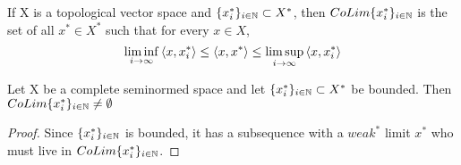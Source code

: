 \begin{df}
    If X is a topological vector space and $\{x_i^*\}_{i \in \mathbb{N}} \subset X^*$, then $CoLim\{x_i^*\}_{i \in \mathbb{N}}$ is the set of all $x^* \in X^*$ such that for every $x \in X$,
    \begin{equation}
        \liminf\limits_{i \to \infty} \left\langle x,x_i^* \right\rangle \leq  \left\langle x,x^* \right\rangle \leq \limsup\limits_{i \to \infty} \left\langle x,x_i^* \right\rangle
    \end{equation}
\end{df} 
\begin{rmk}
    \label{rmk:colimnonempty}
    Let X be a complete seminormed space and let $\{x_i^*\}_{i \in \mathbb{N}} \subset X^*$ be bounded. Then $CoLim\{x_i^*\}_{i \in \mathbb{N}} \neq \emptyset$
    \begin{proof}
        Since $\{x_i^*\}_{i \in \mathbb{N}}$ is bounded, it has a subsequence with a $weak^*$ limit $x^*$ who must live in $CoLim\{x_i^*\}_{i \in \mathbb{N}}$.
    \end{proof} 
\end{rmk} 
